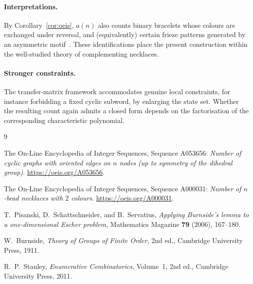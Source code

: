 \documentclass[11pt,a4paper]{article}
\theoremstyle{plain}
\theoremstyle{definition}
\theoremstyle{remark}
\numberwithin{equation}{section}
\begin{document}
\paragraph{Interpretations.}
By Corollary~\ref{cor:oeis}, $a(n)$ also counts binary bracelets whose
colours are exchanged under reversal, and (equivalently) certain frieze
patterns generated by an asymmetric motif~\cite{pisanski}. These
identifications place the present construction within the well-studied
theory of complementing necklaces.

\paragraph{Stronger constraints.}
The transfer-matrix framework accommodates genuine local constraints, for
instance forbidding a fixed cyclic subword, by enlarging the state set.
Whether the resulting count again admits a closed form depends on the
factorisation of the corresponding characteristic polynomial.

\begin{thebibliography}{9}

The On-Line Encyclopedia of Integer Sequences, Sequence A053656:
\emph{Number of cyclic graphs with oriented edges on $n$ nodes (up to
symmetry of the dihedral group)}. \url{https://oeis.org/A053656}.

The On-Line Encyclopedia of Integer Sequences, Sequence A000031:
\emph{Number of $n$-bead necklaces with $2$ colours}.
\url{https://oeis.org/A000031}.

T.~Pisanski, D.~Schattschneider, and B.~Servatius,
\emph{Applying Burnside's lemma to a one-dimensional Escher problem},
Mathematics Magazine \textbf{79} (2006), 167--180.

W.~Burnside, \emph{Theory of Groups of Finite Order}, 2nd ed.,
Cambridge University Press, 1911.

R.~P.~Stanley, \emph{Enumerative Combinatorics}, Volume~1, 2nd ed.,
Cambridge University Press, 2011.

\end{thebibliography}
\end{document}
